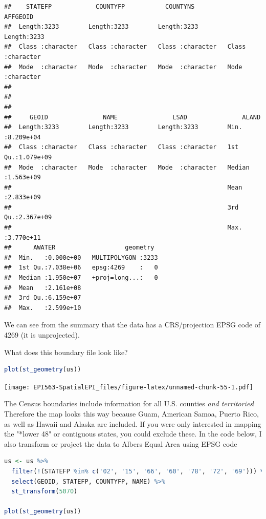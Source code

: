 \documentclass[
]{book}
\begin{document}
\begin{lstlisting}
##    STATEFP            COUNTYFP           COUNTYNS           AFFGEOID        
##  Length:3233        Length:3233        Length:3233        Length:3233       
##  Class :character   Class :character   Class :character   Class :character  
##  Mode  :character   Mode  :character   Mode  :character   Mode  :character  
##                                                                             
##                                                                             
##                                                                             
##     GEOID               NAME               LSAD               ALAND          
##  Length:3233        Length:3233        Length:3233        Min.   :8.209e+04  
##  Class :character   Class :character   Class :character   1st Qu.:1.079e+09  
##  Mode  :character   Mode  :character   Mode  :character   Median :1.563e+09  
##                                                           Mean   :2.833e+09  
##                                                           3rd Qu.:2.367e+09  
##                                                           Max.   :3.770e+11  
##      AWATER                   geometry   
##  Min.   :0.000e+00   MULTIPOLYGON :3233  
##  1st Qu.:7.038e+06   epsg:4269    :   0  
##  Median :1.950e+07   +proj=long...:   0  
##  Mean   :2.161e+08                       
##  3rd Qu.:6.159e+07                       
##  Max.   :2.599e+10
\end{lstlisting}

We can see from the summary that the data has a CRS/projection EPSG code of 4269 (it is unprojected).

What does this boundary file look like?

\begin{lstlisting}[language=R]
plot(st_geometry(us))
\end{lstlisting}

\texttt{[image: EPI563-SpatialEPI\_files/figure-latex/unnamed-chunk-55-1.pdf]}

The Census boundaries include information for all U.S. counties \emph{and territories}! Therefore the map looks this way because Guam, American Samoa, Puerto Rico, as well as Hawaii and Alaska are included. If you were only interested in mapping the "*lower 48" or contiguous states, you could exclude these. In the code below, I also transform or project the data to Albers Equal Area using EPSG code

\begin{lstlisting}[language=R]
us <- us %>%
  filter(!(STATEFP %in% c('02', '15', '66', '60', '78', '72', '69'))) %>%
  select(GEOID, STATEFP, COUNTYFP, NAME) %>%
  st_transform(5070)

plot(st_geometry(us))
\end{lstlisting}
\end{document}
